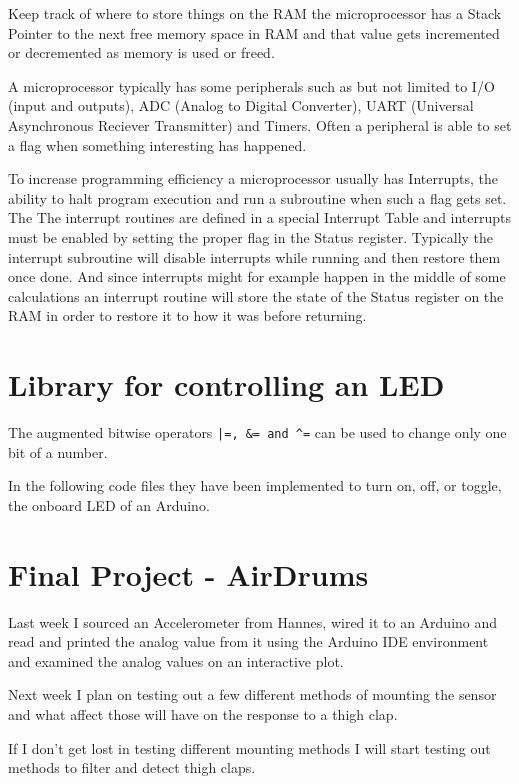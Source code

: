 \documentclass{article}
\begin{document}
Keep track of where to store things on the RAM the microprocessor has a Stack Pointer to the next free memory space in RAM and that value gets incremented or decremented as memory is used or freed.

A microprocessor typically has some peripherals such as but not limited to I/O (input and outputs), ADC (Analog to Digital Converter), UART (Universal Asynchronous Reciever Transmitter) and Timers. Often a peripheral is able to set a flag when something interesting has happened. 

To increase programming efficiency a microprocessor usually has Interrupts, the ability to halt program execution and run a subroutine when such a flag gets set. The The interrupt routines are defined in a special Interrupt Table and interrupts must be enabled by setting the proper flag in the Status register. Typically the interrupt subroutine will disable interrupts while running and then restore them once done. And since interrupts might for example happen in the middle of some calculations an interrupt routine will store the state of the Status register on the RAM in order to restore it to how it was before returning.

\newpage
\section*{Library for controlling an LED}
The augmented bitwise operators \verb"|=, &= and ^=" can be used to change only one bit of a number.

In the following code files they have been implemented to turn on, off, or toggle, the onboard LED of an Arduino.






\section*{Final Project - AirDrums}
Last week I sourced an Accelerometer from Hannes, wired it to an Arduino and read and printed the analog value from it using the Arduino IDE environment and examined the analog values on an interactive plot.

Next week I plan on testing out a few different methods of mounting the sensor and what affect those will have on the response to a thigh clap.

If I don't get lost in testing different mounting methods I will start testing out methods to filter and detect thigh claps.
\end{document}
